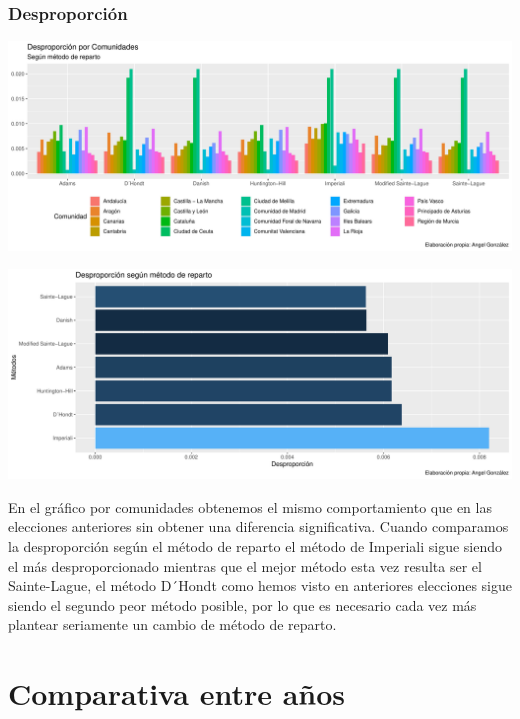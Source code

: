 \documentclass[12pt,a4paper,]{book}
\numberwithin{dummy}{section}
\theoremstyle{ocrenumbox}
\theoremstyle{blacknumex}
\theoremstyle{blacknumbox}
\theoremstyle{ocrenum}
\theoremstyle{ocrenum}
\begin{document}
\hypertarget{desproporciuxf3n-14}{%
\subsubsection{Desproporción}\label{desproporciuxf3n-14}}

\begin{center}\includegraphics[width=0.95\linewidth]{figurasR/unnamed-chunk-186-1} \end{center}

\begin{center}\includegraphics[width=0.95\linewidth]{figurasR/unnamed-chunk-186-2} \end{center}

En el gráfico por comunidades obtenemos el mismo comportamiento que en
las elecciones anteriores sin obtener una diferencia significativa.
Cuando comparamos la desproporción según el método de reparto el método
de Imperiali sigue siendo el más desproporcionado mientras que el mejor
método esta vez resulta ser el Sainte-Lague, el método D´Hondt como
hemos visto en anteriores elecciones sigue siendo el segundo peor método
posible, por lo que es necesario cada vez más plantear seriamente un
cambio de método de reparto.

\hypertarget{comparativa-entre-auxf1os}{%
\section{Comparativa entre años}\label{comparativa-entre-auxf1os}}
\end{document}
